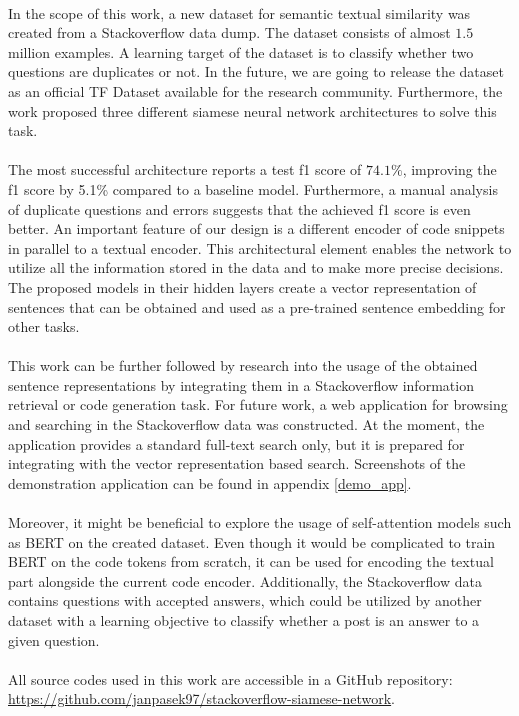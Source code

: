 \paragraph{}
In the scope of this work, a new dataset for semantic textual similarity was created from a Stackoverflow data dump. The dataset consists of almost $1.5$ million examples. A learning target of the dataset is to classify whether two questions are duplicates or not. In the future, we are going to release the dataset as an official TF Dataset available for the research community. Furthermore, the work proposed three different siamese neural network architectures to solve this task.

\paragraph{}
The most successful architecture reports a test f1 score of $74.1\%$, improving the f1 score by 5.1\% compared to a baseline model. Furthermore, a manual analysis of duplicate questions and errors suggests that the achieved f1 score is even better. An important feature of our design is a different encoder of code snippets in parallel to a textual encoder. This architectural element enables the network to utilize all the information stored in the data and to make more precise decisions. The proposed models in their hidden layers create a vector representation of sentences that can be obtained and used as a pre-trained sentence embedding for other tasks.

\paragraph{}
This work can be further followed by research into the usage of the obtained sentence representations by integrating them in a Stackoverflow information retrieval or code generation task. For future work, a web application for browsing and searching in the Stackoverflow data was constructed. At the moment, the application provides a standard full-text search only, but it is prepared for integrating with the vector representation based search. Screenshots of the demonstration application can be found in appendix \ref{demo_app}.

\paragraph{}
Moreover, it might be beneficial to explore the usage of self-attention models such as BERT on the created dataset. Even though it would be complicated to train BERT on the code tokens from scratch, it can be used for encoding the textual part alongside the current code encoder. Additionally, the Stackoverflow data contains questions with accepted answers, which could be utilized by another dataset with a learning objective to classify whether a post is an answer to a given question.

\paragraph{}
All source codes used in this work are accessible in a GitHub repository:\\ \url{https://github.com/janpasek97/stackoverflow-siamese-network}.
